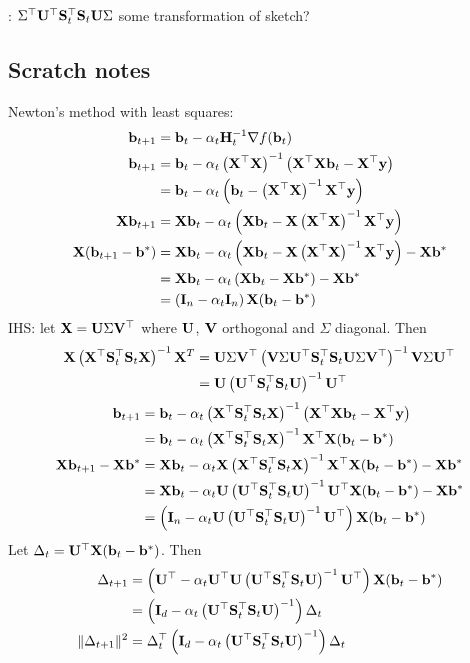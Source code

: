 \documentclass[10pt]{article}
\begin{document}
\todo: $\Sigma^\T\bfU^\T\bfS_t^\T\bfS_t\bfU\Sigma$ some transformation of sketch?


\subsection{Scratch notes}

Newton's method with least squares:
\begin{align*}
\bfb_{t+1} &= \bfb_t - \alpha_t\bfH_t^{-1}\nabla f(\bfb_t) \\
\bfb_{t+1} &= \bfb_t - \alpha_t\left(\bfX^\T\bfX\right)^{-1}\left(\bfX^\T\bfX\bfb_t-\bfX^\T\bfy\right) \\
&= \bfb_t - \alpha_t\left(\bfb_t-\left(\bfX^\T\bfX\right)^{-1}\bfX^\T\bfy\right) \\
\bfX\bfb_{t+1} &= \bfX\bfb_t - \alpha_t\left(\bfX\bfb_t-\bfX\left(\bfX^\T\bfX\right)^{-1}\bfX^\T\bfy\right) \\
\bfX(\bfb_{t+1}-\bfb^*) &= \bfX\bfb_t - \alpha_t\left(\bfX\bfb_t-\bfX\left(\bfX^\T\bfX\right)^{-1}\bfX^\T\bfy\right) - \bfX\bfb^* \\
&= \bfX\bfb_t - \alpha_t\left(\bfX\bfb_t-\bfX\bfb^*\right) - \bfX\bfb^* \\
&= \left(\bfI_n - \alpha_t\bfI_n\right)\bfX(\bfb_t-\bfb^*)
\end{align*}
IHS: let $\bfX=\bfU\Sigma\bfV^\T$ where $\bfU$, $\bfV$ orthogonal and $\Sigma$ diagonal. Then
\begin{align*}
\bfX\left(\bfX^\T\bfS_t^\T\bfS_t\bfX\right)^{-1}\bfX^T &= \bfU\Sigma\bfV^\T\left(\bfV\Sigma\bfU^\T\bfS_t^\T\bfS_t\bfU\Sigma\bfV^\T\right)^{-1}\bfV\Sigma\bfU^\T \\
&= \bfU\left(\bfU^\T\bfS_t^\T\bfS_t\bfU\right)^{-1}\bfU^\T
\end{align*}
\begin{align*}
\bfb_{t+1} &= \bfb_t - \alpha_t\left(\bfX^\T\bfS_t^\T\bfS_t\bfX\right)^{-1}\left(\bfX^\T\bfX\bfb_t-\bfX^\T\bfy\right) \\
&= \bfb_t - \alpha_t\left(\bfX^\T\bfS_t^\T\bfS_t\bfX\right)^{-1}\bfX^\T\bfX(\bfb_t-\bfb^*) \\
\bfX\bfb_{t+1} - \bfX\bfb^* &= \bfX\bfb_t - \alpha_t\bfX\left(\bfX^\T\bfS_t^\T\bfS_t\bfX\right)^{-1}\bfX^\T\bfX(\bfb_t-\bfb^*) - \bfX\bfb^* \\
&= \bfX\bfb_t - \alpha_t\bfU\left(\bfU^\T\bfS_t^\T\bfS_t\bfU\right)^{-1}\bfU^\T\bfX(\bfb_t-\bfb^*) - \bfX\bfb^* \\
&= \left(\bfI_n - \alpha_t\bfU\left(\bfU^\T\bfS_t^\T\bfS_t\bfU\right)^{-1}\bfU^\T\right)\bfX(\bfb_t-\bfb^*)
\end{align*}
Let $\Delta_t = \bfU^\T\bfX(\bfb_t-\bfb^*)$. Then
\begin{align*}
\Delta_{t+1} &= \left(\bfU^\T - \alpha_t\bfU^\T\bfU\left(\bfU^\T\bfS_t^\T\bfS_t\bfU\right)^{-1}\bfU^\T\right)\bfX(\bfb_t-\bfb^*) \\
&= \left(\bfI_d - \alpha_t\left(\bfU^\T\bfS_t^\T\bfS_t\bfU\right)^{-1}\right)\Delta_t \\
\|\Delta_{t+1}\|^2 &= \Delta_t^\T\left(\bfI_d - \alpha_t\left(\bfU^\T\bfS_t^\T\bfS_t\bfU\right)^{-1}\right)\Delta_t
\end{align*}
\end{document}
